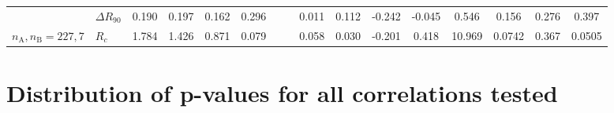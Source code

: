 \begin{landscape}
\begin{table}
\begin{tabular}{@{} ll @{\ } S[round-mode=places]S[round-mode=places] S[round-mode=places]S[round-mode=places] SS SS @{\quad\quad\quad} SSS @{\quad} S@{}S@{}S @{}}
 & \(\Delta R_{90}\) & 0.190 & 0.197 & 0.162 & 0.296 &  &  & 0.011 & 0.112 & -0.242 & -0.045 & 0.546 & 0.156 & 0.276 & 0.397\\
\(n_{\text{A}}, n_{\text{B}} = 227, 7\) & \(R_{c}\) & 1.784 & 1.426 & 0.871 & 0.079 &  &  & 0.058 & 0.030 & -0.201 & 0.418 & 10.969 & 0.0742 & 0.367 & 0.0505\\
\bottomrule
\end{tabular}
\end{table}
\end{landscape}

\section{Distribution of p-values for all correlations tested}
\label{sec:distr-p-values}

